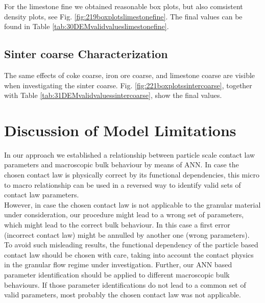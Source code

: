 For the limestone fine we obtained reasonable box plots, but also comsistent
density plots, see Fig.
\ref{fig:219boxplotslimestonefine}.
The final values can be found in Table \ref{tab:30DEMvalidvalueslimestonefine}.


%


\subsection{Sinter coarse Characterization}
\label{subsec:sintercoarsecharacterization}

The same effects of coke coarse, iron ore coarse, and limestone coarse are
visible when investigating the sinter coarse.
Fig. \ref{fig:221boxplotssintercoarse}, together with Table
\ref{tab:31DEMvalidvaluessintercoarse}, show the final values.



%

\section{Discussion of Model Limitations}
\label{sec:discussion}
In our approach we established a relationship between particle scale contact law
parameters and macroscopic bulk behaviour by means of \acs{ANN}. 
In case the chosen contact law is physically correct by its functional dependencies, 
this micro to macro relationship can be used in a reversed way to identify 
valid sets of contact law parameters.\\
However, in case the chosen contact law is not applicable to the granular 
material under consideration, 
our procedure might lead to a wrong set of parameters, which might lead to the
correct bulk behaviour.
In this case a first error (incorrect contact law) might be annulled by another
one (wrong parameters).\\
To avoid such misleading results, the functional dependency of the particle based contact 
law should be chosen with care, taking into account the contact physics in the granular 
flow regime under investigation. 
Further, our \acs{ANN} based parameter
identification should be applied to different macroscopic bulk behaviours. 
If those parameter identifications do not 
lead to a common set of valid parameters, most probably the chosen contact law was not applicable. 
